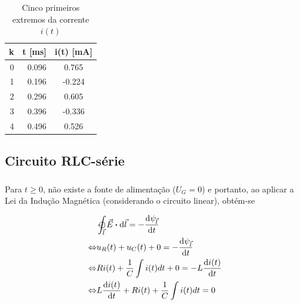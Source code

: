\documentclass[a4paper, titlepage, portuguese]{article}
\newcommand{\eq}{\Leftrightarrow} %
\begin{document}
	\subsubsection{}
	\begin{table}[H]
		\centering
		\caption{Cinco primeiros extremos da corrente $i(t)$}
		\label{tab:extemos}
		\begin{tabular}{| r | r | S |}
			\hline
			\textbf{k} & \textbf{t} [\si{\milli\second}] & \textbf{i(t)} [\si{\milli\ampere}] \\
			 & 0.096 & 0.765 \\
			1 & 0.196 & -0.224 \\
			2 & 0.296 & 0.605 \\
			3 & 0.396 & -0.336 \\
			4 & 0.496 & 0.526 \\
			\hline
		\end{tabular}
	\end{table}

	\subsubsection{}

	\subsubsection{}

	\subsection{Circuito RLC-série}
	\subsubsection{}
	
		\par
		Para $t \geq 0$, não existe a fonte de alimentação ($U_G = 0$) e portanto, ao aplicar a Lei da Indução Magnética (considerando o circuito linear), obtém-se 
		
		\begin{align*}
			&\ointclockwise_{\vec{l}} \vec{E} \vdot \dd{\vec{l}} = - \dv{\psi_{\vec{l}}}{t} \\ \eq
			&u_R(t) + u_C(t) + 0 = - \dv{\psi_{\vec{l}}}{t} \\ \eq
			&Ri(t) + \frac{1}{C} \int i(t) dt + 0 = -L \dv{i(t)}{t} \\ \eq
			&L \dv{i(t)}{t} + Ri(t) + \frac{1}{C} \int i(t) dt = 0 \\ 
		\end{align*}
	
\end{document}
